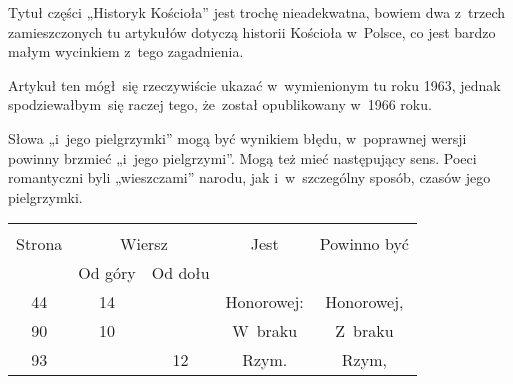 \documentclass[a4paper,11pt]{article}
\begin{document}
\start {} Tytuł części „Historyk Kościoła” jest trochę
nieadekwatna, bowiem dwa z~trzech zamieszczonych tu artykułów dotyczą
historii Kościoła w~Polsce, co jest bardzo małym wycinkiem z~tego
zagadnienia.

\vspace{\spaceFour}



\start {} Artykuł ten mógł~się rzeczywiście ukazać
w~wymienionym tu roku 1963, jednak spodziewałbym~się raczej tego,
że~został opublikowany w~1966 roku.

\vspace{\spaceFour}



\start {} Słowa „i~jego pielgrzymki” mogą być wynikiem
błędu, w~poprawnej wersji powinny brzmieć „i~jego pielgrzymi”. Mogą
też mieć następujący sens. Poeci romantyczni byli „wieszczami”
narodu, jak i~w~szczególny sposób, czasów jego pielgrzymki.







\begin{center}

  \begin{tabular}{|c|c|c|c|c|}
    \hline
    & \multicolumn{2}{c|}{} & & \\
    Strona & \multicolumn{2}{c|}{Wiersz} & Jest
                              & Powinno być \\ \cline{2-3}
    & Od góry & Od dołu & & \\
    \hline
    44  & 14 & & Honorowej: & Honorowej, \\
    90  & 10 & & W~braku & Z~braku \\
    93  & & 12 & Rzym. & Rzym, \\
    \hline
  \end{tabular}

\end{center}
\end{document}
